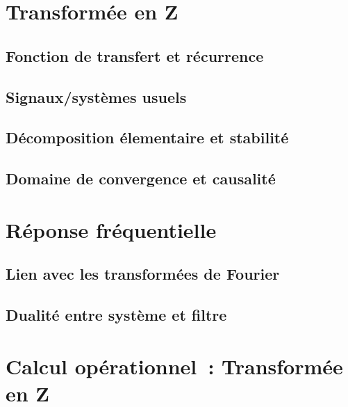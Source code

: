 \section{Transformée en Z}

\subsection{Fonction de transfert et récurrence}
\subsection{Signaux/systèmes usuels}
\subsection{Décomposition élementaire et stabilité}
\subsection{Domaine de convergence et causalité}

\section{Réponse fréquentielle}
\subsection{Lien avec les transformées de Fourier}
\subsection{Dualité entre système et filtre}



\section{Calcul opérationnel~: Transformée en Z}


